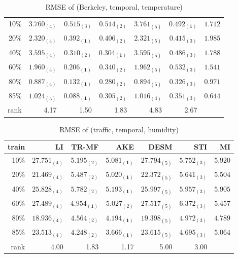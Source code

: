 \begin{table}[htbp]
\setlength{\tabcolsep}{2pt}
\centering
\caption{RMSE of (Berkeley, temporal, temperature)}
\label{table:berkeley_temporal_tem}
\begin{tabular}{ r | r r r r r r}
    10\% & $ 3.760_{(4)} $ & $ 0.515_{(3)} $ & $ 0.514_{(2)} $ & $3.761_{(5)}$ & $\mathbf{ 0.492_{(1)}}$ &$1.712$\\
    20\% & $ 2.320_{(4)} $ & $ \mathbf{ 0.392_{(1)} } $ & $ 0.406_{(2)} $ & $ 2.321_{(5)} $ & $ 0.415_{(3)} $ &$1.985$\\
    40\% & $ 3.595_{(4)} $ & $ 0.310_{(2)} $ & $ \mathbf{ 0.304_{(1)} } $ & $ 3.595_{(5)} $ & $ 0.486_{(3)} $ &$1.788$\\
    60\% & $ 1.960_{(4)} $ & $ \mathbf{ 0.206_{(1)} } $ & $ 0.340_{(2)} $ & $ 1.962_{(5)} $ & $ 0.532_{(3)} $ &$1.541$\\
    80\% & $ 0.887_{(4)} $ & $ \mathbf{ 0.132_{(1)} } $ & $ 0.280_{(2)} $ & $ 0.894_{(5)} $ & $ 0.326_{(3)} $ &$0.971$\\
    85\% & $ 1.024_{(5)} $ & $ \mathbf{ 0.088_{(1)} } $ & $ 0.305_{(2)} $ & $ 1.016_{(4)} $ & $ 0.351_{(3)} $ &$0.644$\\ \hline
rank &4.17 &1.50 &1.83 &4.83 &2.67 \\
\end{tabular}
\end{table}





\begin{table} [htbp]
\setlength{\tabcolsep}{2pt}
\centering
\caption{RMSE of (traffic, temporal, humidity)}
\label{table:traffic_temporal_hum}
\begin{tabular}{ r | r r r r r r}
	train	&LI	&TR-MF	&AKE	&DESM	&STI &MI\\ \hline
	10\% & $ 27.751_{(4)} $ & $ 5.195_{(2)} $ & $ \mathbf{ 5.081_{(1)} } $ & $ 27.794_{(5)} $ & $ 5.752_{(3)} $ &$5.920$\\
	20\% & $ 21.469_{(4)} $ & $ 5.487_{(2)} $ & $ \mathbf{ 5.020_{(1)} } $ & $ 22.372_{(5)} $ & $ 5.641_{(3)} $ &$5.504$\\
	40\% & $ 25.828_{(4)} $ & $ 5.782_{(2)} $ & $ \mathbf{ 5.193_{(1)} } $ & $ 25.997_{(5)} $ & $ 5.957_{(3)} $ &$5.905$\\
	60\% & $ 27.489_{(4)} $ & $ \mathbf{ 4.954_{(1)} } $ & $ 5.027_{(2)} $ & $ 27.517_{(5)} $ & $ 6.372_{(3)} $ &$5.457$\\
	80\% & $ 18.936_{(4)} $ & $ 4.564_{(2)} $ & $ \mathbf{ 4.194_{(1)} } $ & $ 19.398_{(5)} $ & $ 4.972_{(3)} $ &$4.789$\\
	85\% & $ 23.513_{(4)} $ & $ 4.248_{(2)} $ & $ \mathbf{ 3.666_{(1)} } $ & $ 23.615_{(5)} $ & $ 4.695_{(3)} $ &$5.064$\\ \hline
	rank &4.00 &1.83 &1.17 &5.00 &3.00 \\
\end{tabular}
\end{table}


